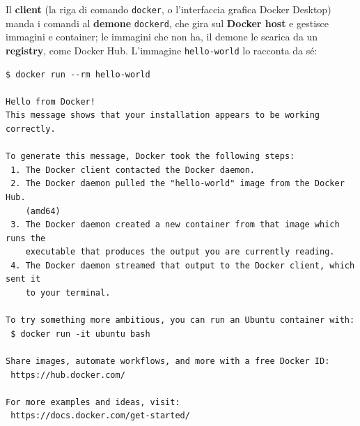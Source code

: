 \begin{center}
\end{center}

Il \textbf{client} (la riga di comando \texttt{docker}, o l'interfaccia grafica Docker Desktop) manda i comandi al
\textbf{demone} \texttt{dockerd}, che gira sul \textbf{Docker host} e gestisce immagini e container; le immagini che
non ha, il demone le scarica da un \textbf{registry}, come Docker Hub. L'immagine \texttt{hello-world} lo racconta da
sé:

\begin{lstlisting}[style=shell, name=Terminale]
$ docker run --rm hello-world

Hello from Docker!
This message shows that your installation appears to be working correctly.

To generate this message, Docker took the following steps:
 1. The Docker client contacted the Docker daemon.
 2. The Docker daemon pulled the "hello-world" image from the Docker Hub.
    (amd64)
 3. The Docker daemon created a new container from that image which runs the
    executable that produces the output you are currently reading.
 4. The Docker daemon streamed that output to the Docker client, which sent it
    to your terminal.

To try something more ambitious, you can run an Ubuntu container with:
 $ docker run -it ubuntu bash

Share images, automate workflows, and more with a free Docker ID:
 https://hub.docker.com/

For more examples and ideas, visit:
 https://docs.docker.com/get-started/
\end{lstlisting}

